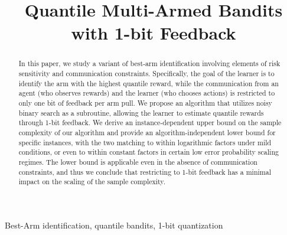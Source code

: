 \documentclass[final,12pt]{alt2025} %
\title[Quantile Multi-Armed Bandits with 1-bit Feedback]{Quantile Multi-Armed Bandits with 1-bit Feedback}
\begin{document}
\maketitle

\begin{abstract}
   In this paper, we study a variant of best-arm identification involving elements of risk sensitivity and communication constraints. Specifically, the goal of the learner is to identify the arm with the highest quantile reward, while the communication from an agent (who observes rewards) and the learner (who chooses actions) is restricted to only one bit of feedback per arm pull. We propose an algorithm that utilizes noisy binary search as a subroutine, allowing the learner to estimate quantile rewards through 1-bit feedback. We derive an instance-dependent upper bound on the sample complexity of our algorithm and provide an algorithm-independent lower bound for specific instances, with the two matching to within logarithmic factors under mild conditions, or even to within constant factors in certain low error probability scaling regimes. The lower bound is applicable even in the absence of communication constraints, and thus we conclude that restricting to 1-bit feedback has a minimal impact on the scaling of the sample complexity.
\end{abstract}

\begin{keywords}%
  Best-Arm identification, quantile bandits, 1-bit quantization
\end{keywords}










\newpage


\newpage
\appendix









\end{document}
